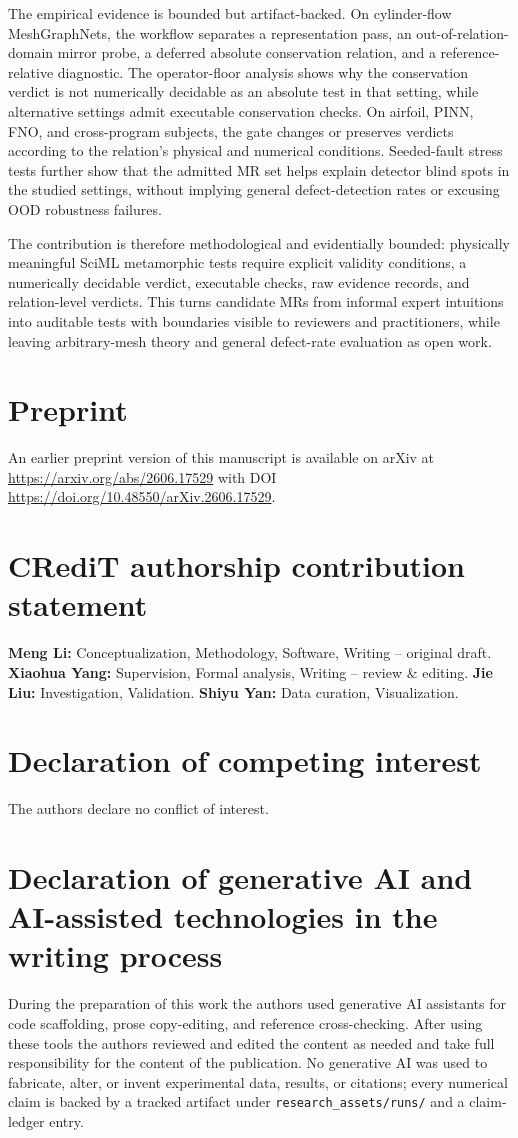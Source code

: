 \documentclass[preprint,12pt,authoryear]{elsarticle}
\begin{document}
The empirical evidence is bounded but artifact-backed. On cylinder-flow MeshGraphNets, the workflow separates a representation pass, an out-of-relation-domain mirror probe, a deferred absolute conservation relation, and a reference-relative diagnostic. The operator-floor analysis shows why the conservation verdict is not numerically decidable as an absolute test in that setting, while alternative settings admit executable conservation checks. On airfoil, PINN, FNO, and cross-program subjects, the gate changes or preserves verdicts according to the relation's physical and numerical conditions. Seeded-fault stress tests further show that the admitted MR set helps explain detector blind spots in the studied settings, without implying general defect-detection rates or excusing OOD robustness failures.

The contribution is therefore methodological and evidentially bounded: physically meaningful SciML metamorphic tests require explicit validity conditions, a numerically decidable verdict, executable checks, raw evidence records, and relation-level verdicts. This turns candidate MRs from informal expert intuitions into auditable tests with boundaries visible to reviewers and practitioners, while leaving arbitrary-mesh theory and general defect-rate evaluation as open work.

\section*{Preprint}
An earlier preprint version of this manuscript is available on arXiv at \url{https://arxiv.org/abs/2606.17529} with DOI \url{https://doi.org/10.48550/arXiv.2606.17529}.

\section*{CRediT authorship contribution statement}
\textbf{Meng Li:} Conceptualization, Methodology, Software, Writing -- original draft. \textbf{Xiaohua Yang:} Supervision, Formal analysis, Writing -- review \& editing. \textbf{Jie Liu:} Investigation, Validation. \textbf{Shiyu Yan:} Data curation, Visualization.

\section*{Declaration of competing interest}
The authors declare no conflict of interest.

\section*{Declaration of generative AI and AI-assisted technologies in the writing process}
During the preparation of this work the authors used generative AI assistants for code scaffolding, prose copy-editing, and reference cross-checking. After using these tools the authors reviewed and edited the content as needed and take full responsibility for the content of the publication. No generative AI was used to fabricate, alter, or invent experimental data, results, or citations; every numerical claim is backed by a tracked artifact under \texttt{research\_assets/runs/} and a claim-ledger entry.
\end{document}
